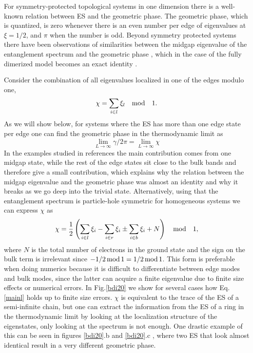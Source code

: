 \documentclass[twocolumn,amsmath,longbibliography,amssymb,superscriptaddress]{revtex4-1}
\begin{document}
For symmetry-protected topological systems in one dimension there is a well-known relation between ES and the geometric phase. The geometric phase, which is quantized, is zero whenever there is an even number per edge of eigenvalues at $\xi = 1/2$, and $\pi$ when the number is odd. Beyond symmetry protected systems there have been observations of similarities between the midgap eigenvalue of the entanglement spectrum and the geometric phase \cite{Ryu2006,Huang2012,Huang2012-2}, which in the case of the fully dimerized model becomes an exact identity \cite{Ryu2006}. 

Consider the combination of all eigenvalues localized in one of the edges modulo one,
\begin{equation}
\chi = \sum_{i \in l} \xi_l \quad {\rm mod} \quad 1. 
\end{equation}
As we will show below, for systems where the ES has more than one edge state per edge one can find the geometric phase in the thermodynamic limit as
\begin{equation}
\lim_{L \rightarrow \infty}\gamma/2\pi =\lim_{L \rightarrow \infty} \chi
\label{mainl}
\end{equation}
In the examples studied in references \cite{Ryu2006,Huang2012,Huang2012-2} the main contribution comes from one midgap state, while the rest of the edge states sit close to the bulk bands and therefore give a small contribution, which explains why the relation between the midgap eigenvalue and the geometric phase was almost an identity and why it breaks as we go deep into the trivial state. Alternatively, using that the entanglement spectrum is particle-hole symmetric for homogeneous systems we can express $\chi$ as
\begin{equation*}
\chi = \frac{1}{2} \left( \sum_{i\in l}\xi_i-\sum_{i\in r}\xi_i \pm \sum_{i\in b}\xi_i  + N \right) \quad {\rm mod} \quad 1,
\end{equation*}
where $N$ is the total number of electrons in the ground state and the sign on the bulk term is irrelevant since $-1/2 \, {\rm mod} \, 1 = 1/2 \, {\rm mod} \, 1$. This form is preferable when doing numerics because it is difficult to differentiate between edge modes and bulk modes, since the latter can acquire a finite eigenvalue due to finite size effects or numerical errors. In Fig.\ref{bdi20} we show for several cases how Eq. \ref{mainl} holds up to finite size errors. $\chi$ is equivalent to the trace of the ES of a semi-infinite chain, but one can extract the information from the ES of a ring in the thermodynamic limit by looking at the localization structure of the eigenstates, only looking at the spectrum is not enough. One drastic example of this can be seen in figures \ref{bdi20}.b and \ref{bdi20}.c , where two ES that look almost identical result in a very different geometric phase. 
\end{document}
